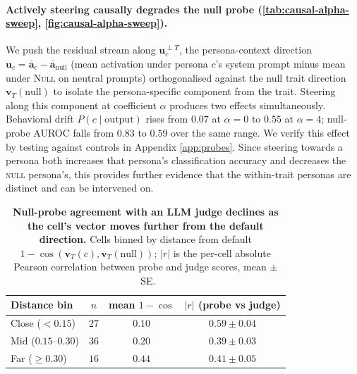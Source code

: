 \documentclass{article}
\theoremstyle{plain}
\theoremstyle{definition}
\theoremstyle{remark}
\begin{document}
\paragraph{Actively steering causally degrades the null probe (\cref{tab:causal-alpha-sweep}, \cref{fig:causal-alpha-sweep}).}
We push the residual stream along $\mathbf{u}_c^{\perp T}$, the persona-context direction $\mathbf{u}_c = \bar{\mathbf{a}}_c - \bar{\mathbf{a}}_{\text{null}}$ (mean activation under persona $c$'s system prompt minus mean under \textsc{Null} on neutral prompts) orthogonalised against the null trait direction $\mathbf{v}_T(\text{null})$ to isolate the persona-specific component from the trait. Steering along this component at coefficient $\alpha$ produces two effects simultaneously. Behavioral drift $P(c \mid \text{output})$ rises from $0.07$ at $\alpha = 0$ to $0.55$ at $\alpha = 4$; null-probe AUROC falls from $0.83$ to $0.59$ over the same range. We verify this effect by testing against controls in Appendix \ref{app:probes}. Since steering towards a persona both increases that persona's classification accuracy and decreases the \textsc{null} persona's, this provides further evidence that the within-trait personas are distinct and can be intervened on. %


\begin{table}[t]
    \centering
    \small
    \setlength{\tabcolsep}{4pt}
    \caption{\textbf{Null-probe agreement with an LLM judge declines as the cell's vector moves further from the default direction.} Cells binned by distance from default $1-\cos(\mathbf{v}_T(c),\mathbf{v}_T(\text{null}))$; $|r|$ is the per-cell absolute Pearson correlation between probe and judge scores, mean $\pm$~SE.}
    \label{tab:probe-naturalistic}
    \begin{tabular}{lccc}
        \toprule
        Distance bin & $n$ & mean $1{-}\cos$ & $|r|$ (probe vs judge) \\
        \midrule
        Close ($< 0.15$)        & $27$ & $0.10$ & $0.59 \pm 0.04$ \\
        Mid ($0.15$--$0.30$)    & $36$ & $0.20$ & $0.39 \pm 0.03$ \\
        Far ($\geq 0.30$)       & $16$ & $0.44$ & $0.41 \pm 0.05$ \\
        \bottomrule
    \end{tabular}
\end{table}
\end{document}
